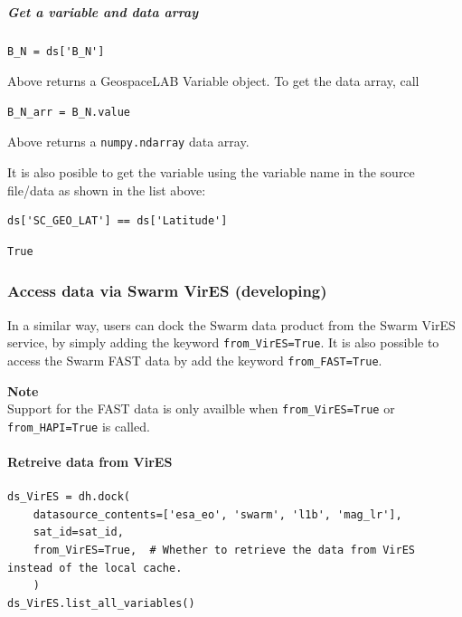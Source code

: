 \subparagraph{Get a variable and data array}

\begin{verbatim}
B_N = ds['B_N']
\end{verbatim}

Above returns a GeospaceLAB Variable object. To get the data array, call

\begin{verbatim}
B_N_arr = B_N.value
\end{verbatim}

Above returns a \texttt{numpy.ndarray} data array.

It is also posible to get the variable using the variable name in the source file/data as shown in the list above:

\begin{verbatim}
ds['SC_GEO_LAT'] == ds['Latitude']
\end{verbatim}

\begin{verbatim}
True
\end{verbatim}

\subsubsection{Access data via Swarm VirES (developing)}\label{swarm-vires}

In a similar way, users can dock the Swarm data product from the Swarm VirES service, by simply adding the keyword \texttt{from\_VirES=True}. It is also possible to access the Swarm FAST data by add the keyword \texttt{from\_FAST=True}.

\begin{framed}
\textbf{Note}\\
Support for the FAST data is only availble when \texttt{from\_VirES=True} or \texttt{from\_HAPI=True} is called.
\end{framed}

\paragraph{Retreive data from VirES}

\begin{verbatim}
ds_VirES = dh.dock(
    datasource_contents=['esa_eo', 'swarm', 'l1b', 'mag_lr'], 
    sat_id=sat_id,
    from_VirES=True,  # Whether to retrieve the data from VirES instead of the local cache. 
    )
ds_VirES.list_all_variables()
\end{verbatim}


